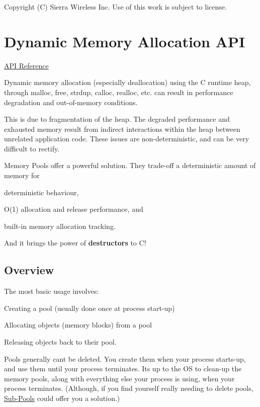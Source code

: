 Copyright (C) Sierra Wireless Inc. Use of this work is subject to license. \hypertarget{c_memory}{}\section{Dynamic Memory Allocation A\+P\+I}\label{c_memory}
\hyperlink{le__mem_8h}{A\+P\+I Reference}





Dynamic memory allocation (especially deallocation) using the C runtime heap, through malloc, free, strdup, calloc, realloc, etc. can result in performance degradation and out-\/of-\/memory conditions.

This is due to fragmentation of the heap. The degraded performance and exhausted memory result from indirect interactions within the heap between unrelated application code. These issues are non-\/deterministic, and can be very difficult to rectify.

Memory Pools offer a powerful solution. They trade-\/off a deterministic amount of memory for
\begin{DoxyItemize}
\item deterministic behaviour,
\item O(1) allocation and release performance, and
\item built-\/in memory allocation tracking.
\end{DoxyItemize}

And it brings the power of {\bfseries destructors} to C!\hypertarget{c_memory_mem_overview}{}\subsection{Overview}\label{c_memory_mem_overview}
The most basic usage involves\+:
\begin{DoxyItemize}
\item Creating a pool (usually done once at process start-\/up)
\item Allocating objects (memory blocks) from a pool
\item Releasing objects back to their pool.
\end{DoxyItemize}

Pools generally can\textquotesingle{}t be deleted. You create them when your process starts-\/up, and use them until your process terminates. It\textquotesingle{}s up to the O\+S to clean-\/up the memory pools, along with everything else your process is using, when your process terminates. (Although, if you find yourself really needing to delete pools, \hyperlink{c_memory_mem_sub_pools}{Sub-\/\+Pools} could offer you a solution.)


